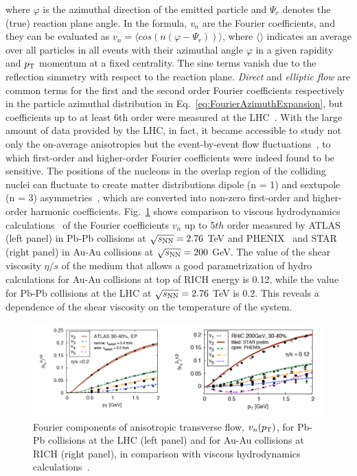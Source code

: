 where $\varphi$ is the azimuthal direction of the emitted particle and 
$\Psi_r$ denotes the (true) reaction plane angle.
In the formula, {\it v$_n$} are the Fourier coefficients, and they can be 
evaluated as $v_n = \langle cos(n(\varphi - \Psi_r)) \rangle$, where 
$\langle \rangle$ indicates an average over all particles in all events with
 their azimuthal angle $\varphi$ in a given rapidity and $p_{\rm T}$ momentum at
  a fixed centrality. The sine terms vanish due to the reflection simmetry 
  with respect to the reaction plane. {\it Direct} and {\it elliptic flow} 
  are common terms for the first and the
second order Fourier coefficients respectively in the particle azimuthal 
distribution in Eq.~\ref{eq:FourierAzimuthExpansion}, but coefficients 
up to at least 6th order were measured at the LHC~\cite{ATLAS:2012at}.
With the large amount of data provided by the LHC, in fact, it became accessible
to study not only the on-average anisotropies but the event-by-event flow 
fluctuations~\cite{Aad:2013xma,Schukraft:2012ah}, to which first-order and higher-order Fourier 
coefficients were indeed found to be sensitive. 
The positions of the nucleons in the overlap region of the colliding nuclei 
can fluctuate to create matter distributions dipole (n = 1) and
sextupole (n = 3) asymmetries~\cite{Teaney:2010vd,Alver:2010dn,Alver:2010gr}, which are converted into 
non-zero first-order and higher-order harmonic coefficients. 
Fig.~\ref{fig:vnHydro} shows
   comparison to viscous hydrodynamics calculations~\cite{Gale:2012rq} of the 
   Fourier coefficients $v_n$ up to 5$th$ order measured by ATLAS~\cite{ATLAS:2012at}
    (left panel) in Pb-Pb collisions at $\sqrt{s_{\rm NN}} = 2.76$ TeV and 
    PHENIX~\cite{Adare:2011tg} and STAR~\cite{Pandit:2012mq} 
    (right panel) in Au-Au collisions at $\sqrt{s_{\rm NN}} = 200 $ GeV. The value
     of the shear viscosity $\eta/s$ of the medium that allows a good parametrization 
     of hydro calculations for Au-Au collisions at top of RICH energy is 0.12, while the value
      for Pb-Pb collisions at the LHC at $\sqrt{s_{\rm NN}} = 2.76$ TeV is 0.2. 
      This reveals a dependence of the shear viscosity on the temperature of the system.
\begin{figure}[!ht]
  \centering
  \includegraphics[width=15cm]{FigCap1/RICH_ATLAS_vn.png}
  \caption{Fourier components of anisotropic transverse flow, $v_n(p_{\rm T})$, for Pb-Pb collisions at the LHC (left panel) and for Au-Au collisions at RICH (right panel), in comparison with viscous hydrodynamics calculations~\cite{Gale:2012rq}.}
  \label{fig:vnHydro}
\end{figure}
